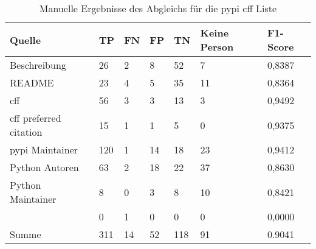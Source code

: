 \begin{table}[H]
    \centering
    \begin{tabularx}{\textwidth}{XR{.7cm}R{.7cm}R{.7cm}R{.7cm}R{2.8cm}R{2cm}}
        \toprule
        \textbf{Quelle} & \textbf{TP} & \textbf{FN} & \textbf{FP} & \textbf{TN} & \textbf{Keine Person} & \textbf{F1-Score} \\ \midrule
        Beschreibung                 & 26  & 2  & 8  & 52  & 7  & 0,8387 \\
        README                       & 23  & 4  & 5  & 35  & 11 & 0,8364 \\
        \gls{cff}                    & 56  & 3  & 3  & 13  & 3  & 0,9492 \\
        \gls{cff} preferred citation & 15  & 1  & 1  & 5   & 0  & 0,9375 \\
        \gls{pypi} Maintainer        & 120 & 1  & 14 & 18  & 23 & 0,9412 \\
        Python Autoren               & 63  & 2  & 18 & 22  & 37 & 0,8630 \\
        Python Maintainer            & 8   & 0  & 3  & 8   & 10 & 0,8421 \\
                      & 0   & 1  & 0  & 0   & 0  & 0,0000 \\ \midrule
        Summe                        & 311 & 14 & 52 & 118 & 91 & 0.9041 \\
        \bottomrule
    \end{tabularx}
    \caption{Manuelle Ergebnisse des Abgleichs für die \gls{pypi} \gls{cff} Liste}
    \label{tab:pypi_cff_matching_results_manual_anhang}
\end{table}
